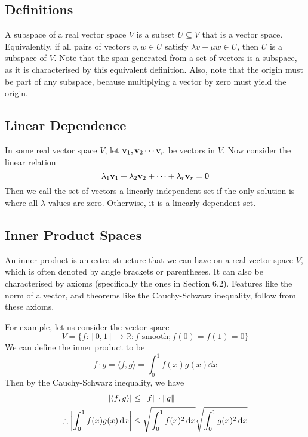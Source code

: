 \subsection{Definitions}
A subspace of a real vector space \(V\) is a subset \(U \subseteq V\) that is a vector space.
Equivalently, if all pairs of vectors \(v, w \in U\) satisfy \(\lambda v + \mu w \in U\), then \(U\) is a subspace of \(V\).
Note that the span generated from a set of vectors is a subspace, as it is characterised by this equivalent definition.
Also, note that the origin must be part of any subspace, because multiplying a vector by zero must yield the origin.

\subsection{Linear Dependence}
In some real vector space \(V\), let \(\vb v_1, \vb v_2 \cdots \vb v_r\) be vectors in \(V\).
Now consider the linear relation
\[
	\lambda_1 \vb v_1 + \lambda_2 \vb v_2 + \cdots + \lambda_r \vb v_r = 0
\]
Then we call the set of vectors a linearly independent set if the only solution is where all \(\lambda\) values are zero.
Otherwise, it is a linearly dependent set.

\subsection{Inner Product Spaces}
An inner product is an extra structure that we can have on a real vector space \(V\), which is often denoted by angle brackets or parentheses.
It can also be characterised by axioms (specifically the ones in Section 6.2).
Features like the norm of a vector, and theorems like the Cauchy-Schwarz inequality, follow from these axioms.

For example, let us consider the vector space
\[
	V = \{ f: [0, 1] \to \mathbb R: f \text{ smooth}; f(0) = f(1) = 0 \}
\]
We can define the inner product to be
\[
	f \cdot g = \langle f, g \rangle = \int_0^1 f(x)g(x)\dd{x}
\]
Then by the Cauchy-Schwarz inequality, we have
\begin{align*}
	\abs{\langle f, g \rangle}               & \leq \norm{f} \cdot \norm{g}                                    \\
	\therefore \abs{\int_0^1 f(x)g(x)\dd{x}} & \leq \sqrt{\int_0^1 f(x)^2 \dd{x}}\sqrt{\int_0^1 g(x)^2 \dd{x}}
\end{align*}

